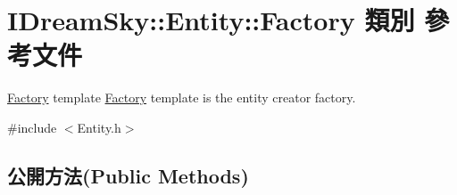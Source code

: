\hypertarget{class_i_dream_sky_1_1_entity_1_1_factory}{}\section{I\+Dream\+Sky\+:\+:Entity\+:\+:Factory 類別 參考文件}
\label{class_i_dream_sky_1_1_entity_1_1_factory}


\hyperlink{class_i_dream_sky_1_1_entity_1_1_factory}{Factory} template \hyperlink{class_i_dream_sky_1_1_entity_1_1_factory}{Factory} template is the entity creator factory.  




{\ttfamily \#include $<$Entity.\+h$>$}

\subsection*{公開方法(Public Methods)}
